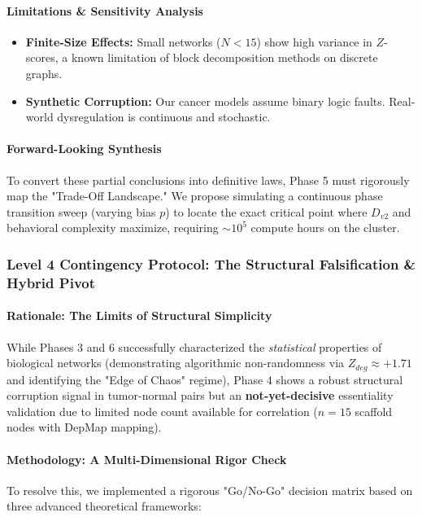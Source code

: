 \paragraph{Limitations \& Sensitivity Analysis}
\begin{itemize}
    \item \textbf{Finite-Size Effects:} Small networks ($N<15$) show high variance in $Z$-scores, a known limitation of block decomposition methods on discrete graphs.
    \item \textbf{Synthetic Corruption:} Our cancer models assume binary logic faults. Real-world dysregulation is continuous and stochastic.
\end{itemize}

\paragraph{Forward-Looking Synthesis}
To convert these partial conclusions into definitive laws, Phase 5 must rigorously map the "Trade-Off Landscape." We propose simulating a continuous phase transition sweep (varying bias $p$) to locate the exact critical point where $D_{v2}$ and behavioral complexity maximize, requiring $\sim 10^5$ compute hours on the cluster.

\subsubsection{Level 4 Contingency Protocol: The Structural Falsification \& Hybrid Pivot}
\label{sec:level4}

\paragraph{Rationale: The Limits of Structural Simplicity}
While Phases 3 and 6 successfully characterized the \textit{statistical} properties of biological networks (demonstrating algorithmic non-randomness via $Z_{deg} \approx +1.71$ and identifying the "Edge of Chaos" regime), Phase 4 shows a robust structural corruption signal in tumor-normal pairs but an \textbf{not-yet-decisive} essentiality validation due to limited node count available for correlation ($n=15$ scaffold nodes with DepMap mapping).


\paragraph{Methodology: A Multi-Dimensional Rigor Check}
To resolve this, we implemented a rigorous "Go/No-Go" decision matrix based on three advanced theoretical frameworks:

